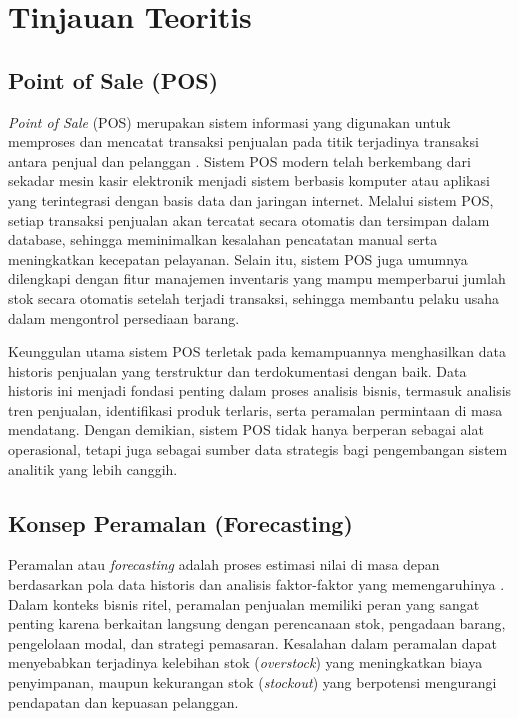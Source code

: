 \section{Tinjauan Teoritis}

\subsection{Point of Sale (POS)}
\textit{Point of Sale} (POS) merupakan sistem informasi yang digunakan untuk memproses dan mencatat transaksi penjualan pada titik terjadinya transaksi antara penjual dan pelanggan \cite{Wijaya2022}. Sistem POS modern telah berkembang dari sekadar mesin kasir elektronik menjadi sistem berbasis komputer atau aplikasi yang terintegrasi dengan basis data dan jaringan internet. Melalui sistem POS, setiap transaksi penjualan akan tercatat secara otomatis dan tersimpan dalam database, sehingga meminimalkan kesalahan pencatatan manual serta meningkatkan kecepatan pelayanan. Selain itu, sistem POS juga umumnya dilengkapi dengan fitur manajemen inventaris yang mampu memperbarui jumlah stok secara otomatis setelah terjadi transaksi, sehingga membantu pelaku usaha dalam mengontrol persediaan barang.

Keunggulan utama sistem POS terletak pada kemampuannya menghasilkan data historis penjualan yang terstruktur dan terdokumentasi dengan baik. Data historis ini menjadi fondasi penting dalam proses analisis bisnis, termasuk analisis tren penjualan, identifikasi produk terlaris, serta peramalan permintaan di masa mendatang. Dengan demikian, sistem POS tidak hanya berperan sebagai alat operasional, tetapi juga sebagai sumber data strategis bagi pengembangan sistem analitik yang lebih canggih.

\subsection{Konsep Peramalan (Forecasting)}
Peramalan atau \textit{forecasting} adalah proses estimasi nilai di masa depan berdasarkan pola data historis dan analisis faktor-faktor yang memengaruhinya \cite{Prasetyo2023}. Dalam konteks bisnis ritel, peramalan penjualan memiliki peran yang sangat penting karena berkaitan langsung dengan perencanaan stok, pengadaan barang, pengelolaan modal, dan strategi pemasaran. Kesalahan dalam peramalan dapat menyebabkan terjadinya kelebihan stok (\textit{overstock}) yang meningkatkan biaya penyimpanan, maupun kekurangan stok (\textit{stockout}) yang berpotensi mengurangi pendapatan dan kepuasan pelanggan.

